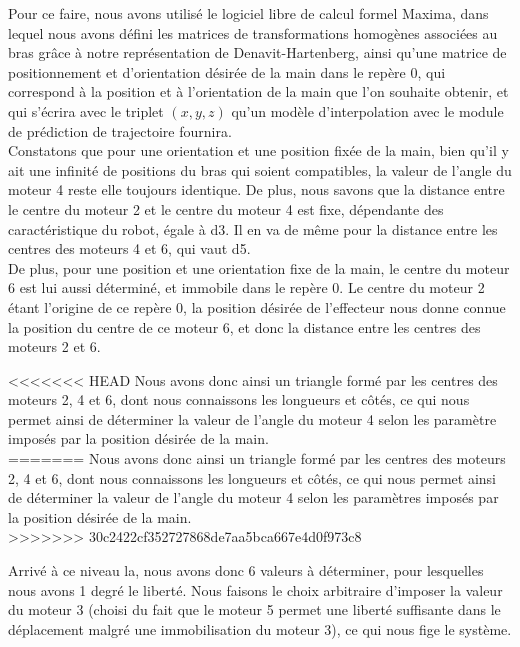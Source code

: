 Pour ce faire, nous avons utilisé le logiciel libre de calcul formel Maxima, dans lequel nous avons défini les matrices de transformations homogènes associées au bras grâce à notre représentation de Denavit-Hartenberg, ainsi qu'une matrice de positionnement et d'orientation désirée de la main dans le repère 0, qui correspond à la position et à l'orientation de la main que l'on souhaite obtenir, et qui s'écrira avec le triplet $(x, y, z)$ qu'un modèle d'interpolation avec le module de prédiction de trajectoire fournira.\\

Constatons que pour une orientation et une position fixée de la main, bien qu'il y ait une infinité de positions du bras qui soient compatibles, la valeur de l'angle du moteur 4 reste elle toujours identique. De plus, nous savons que la distance entre le centre du moteur 2 et le centre du moteur 4 est fixe, dépendante des caractéristique du robot, égale à d3. Il en va de même pour la distance entre les centres des moteurs 4 et 6, qui vaut d5.\\

De plus, pour une position et une orientation fixe de la main, le centre du moteur 6 est lui aussi déterminé, et immobile dans le repère 0. Le centre du moteur 2 étant l'origine de ce repère 0, la position désirée de l'effecteur nous donne connue la position du centre de ce moteur 6, et donc la distance entre les centres des moteurs 2 et 6.
\newpage

<<<<<<< HEAD
Nous avons donc ainsi un triangle formé par les centres des moteurs 2, 4 et 6, dont nous connaissons les longueurs et côtés, ce qui nous permet ainsi de déterminer la valeur de l'angle du moteur 4 selon les paramètre imposés par la position désirée de la main.\\
=======
Nous avons donc ainsi un triangle formé par les centres des moteurs 2, 4 et 6, dont nous connaissons les longueurs et côtés, ce qui nous permet ainsi de déterminer la valeur de l'angle du moteur 4 selon les paramètres imposés par la position désirée de la main.\\
>>>>>>> 30c2422cf352727868de7aa5bca667e4d0f973c8

Arrivé à ce niveau la, nous avons donc 6 valeurs à déterminer, pour lesquelles nous avons 1 degré le liberté. Nous faisons le choix arbitraire d'imposer la valeur du moteur 3 (choisi du fait que le moteur 5 permet une liberté suffisante dans le déplacement malgré une immobilisation du moteur 3), ce qui nous fige le système.\\

